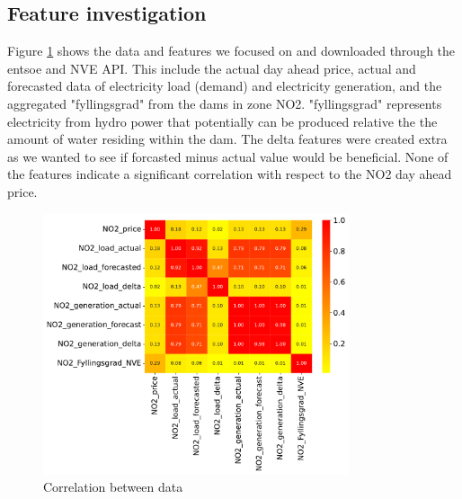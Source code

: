 \documentclass
[twocolumn,
secnumarabic,
nobibnotes,
aps,
prl,
reprint,
groupedaddress,
amsmath,
amssymb,
]{revtex4-2}
\begin{document}
\subsection{Feature investigation}
Figure \ref{fig:feature_correlation} shows the data and features we focused on and downloaded through the entsoe and NVE API. This include the actual day ahead price, actual and forecasted data of electricity load (demand) and electricity  generation, and the aggregated "fyllingsgrad" from the dams in zone NO2. "fyllingsgrad" represents electricity from hydro power that potentially can be produced relative the the amount of water residing within the dam. The delta features were created extra as we wanted to see if forcasted minus actual value would be beneficial. None of the features indicate a significant correlation with respect to the NO2 day ahead price.
\begin{figure}[t]
  \centering
  \includegraphics[width=90mm,scale=1.0]{figures/feature_corr_analysis.pdf}
  \caption{\label{fig:feature_correlation}Correlation between data}
\end{figure}
\end{document}
